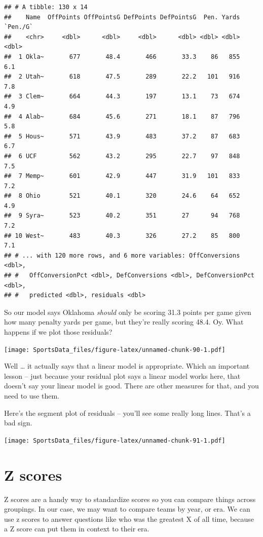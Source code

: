 \documentclass[]{book}
\begin{document}
\begin{verbatim}
## # A tibble: 130 x 14
##    Name  OffPoints OffPointsG DefPoints DefPointsG  Pen. Yards `Pen./G`
##    <chr>     <dbl>      <dbl>     <dbl>      <dbl> <dbl> <dbl>    <dbl>
##  1 Okla~       677       48.4       466       33.3    86   855      6.1
##  2 Utah~       618       47.5       289       22.2   101   916      7.8
##  3 Clem~       664       44.3       197       13.1    73   674      4.9
##  4 Alab~       684       45.6       271       18.1    87   796      5.8
##  5 Hous~       571       43.9       483       37.2    87   683      6.7
##  6 UCF         562       43.2       295       22.7    97   848      7.5
##  7 Memp~       601       42.9       447       31.9   101   833      7.2
##  8 Ohio        521       40.1       320       24.6    64   652      4.9
##  9 Syra~       523       40.2       351       27      94   768      7.2
## 10 West~       483       40.3       326       27.2    85   800      7.1
## # ... with 120 more rows, and 6 more variables: OffConversions <dbl>,
## #   OffConversionPct <dbl>, DefConversions <dbl>, DefConversionPct <dbl>,
## #   predicted <dbl>, residuals <dbl>
\end{verbatim}

So our model says Oklahoma \emph{should} only be scoring 31.3 points per game given how many penalty yards per game, but they're really scoring 48.4. Oy. What happens if we plot those residuals?

\texttt{[image: SportsData\_files/figure-latex/unnamed-chunk-90-1.pdf]}

Well \ldots{} it actually says that a linear model is appropriate. Which an important lesson -- just because your residual plot says a linear model works here, that doesn't say your linear model is good. There are other measures for that, and you need to use them.

Here's the segment plot of residuals -- you'll see some really long lines. That's a bad sign.

\texttt{[image: SportsData\_files/figure-latex/unnamed-chunk-91-1.pdf]}

\hypertarget{z-scores}{%
\chapter{Z scores}\label{z-scores}}

Z scores are a handy way to standardize scores so you can compare things across groupings. In our case, we may want to compare teams by year, or era. We can use z scores to answer questions like who was the greatest X of all time, because a Z score can put them in context to their era.
\end{document}
